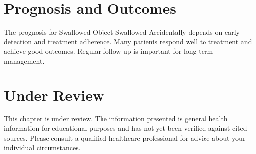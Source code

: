 \section*{Prognosis and Outcomes}
The prognosis for Swallowed Object Swallowed Accidentally depends on early detection and treatment adherence. Many patients respond well to treatment and achieve good outcomes. Regular follow-up is important for long-term management.
\section*{Under Review}
This chapter is under review. The information presented is general health information for educational purposes and has not yet been verified against cited sources. Please consult a qualified healthcare professional for advice about your individual circumstances.


\clearpage
